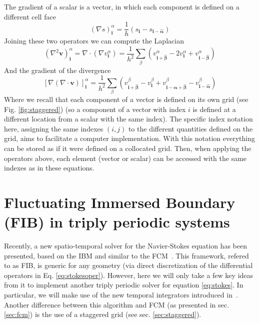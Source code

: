 \documentclass[ twoside,openright,titlepage,numbers=noenddot,%
headinclude,footinclude,cleardoublepage=empty,abstract=on,
BCOR=5mm,paper=b5,fontsize=11pt, dvipsnames
]{scrreprt}
\renewcommand{\vec}[1]{\bm{#1}}
\begin{document}
The gradient of a scalar is a vector, in which each component is defined on a different cell face
\begin{equation}
  \label{eq:staggeredgrad}
  (\nabla s)^\alpha_{\vec{i}} = \frac{1}{h}(s_{\vec{i}} - s_{\vec{i}- \vec{\hat{\alpha}}})
\end{equation}
Joining these two operators we can compute the Laplacian
\begin{equation}
  (\nabla^2\vec{v})^\alpha_{\vec{i}} = \nabla\cdot(\nabla v_{\vec{i}}^\alpha) = \frac{1}{h^2}\sum_\beta\left(v^\alpha_{\vec{i} +\vec{\hat{\beta}}}  - 2v^\alpha_{\vec{i}} + v^\alpha_{\vec{i} -\vec{\hat{\beta}}} \right)
\end{equation}
And the gradient of the divergence
\begin{equation}
  \label{eq:staggeredlap}
\left[\nabla(\nabla\cdot \vec{v})\right]^\alpha_{\vec{i}} = \frac{1}{h^2}\sum_\beta\left(v^\beta_{\vec{i} +\vec{\hat{\beta}}}  - v^\beta_{\vec{i}} + v^\beta_{\vec{i} -\vec{\hat{\alpha}} + \vec{\hat{\beta}}} - v^\beta_{\vec{i} -\vec{\hat{\alpha}}}\right)
\end{equation}
Where we recall that each component of a vector is defined on its own grid (see Fig. \ref{fig:staggered}) (so a component of a vector with index $i$ is defined at a different location from a scalar with the same index). The specific index notation here, assigning the same indexes $(i,j)$ to the different quantities defined on the grid, aims to facilitate a computer implementation. With this notation everything can be stored as if it were defined on a collocated grid. Then, when applying the operators above, each element (vector or scalar) can be accessed with the same indexes as in these equations.



\section{Fluctuating Immersed Boundary (FIB) in triply periodic systems}\label{sec:fib}
Recently, a new spatio-temporal solver for the Navier-Stokes equation has been presented, based on the \gls{IBM} and similar to the \gls{FCM}~\cite{Delong2014}. This framework, refered to as \gls{FIB}, is generic for any geometry (via direct discretization of the differential operators in Eq. \eqref{eq:stokesoper}). However, here we will only take a few key ideas from it to implement another triply periodic solver for equation \eqref{eq:stokes}. In particular, we will make use of the new temporal integrators introduced in~\cite{Delong2014}. Another difference between this algorithm and \gls{FCM} (as presented in sec. \ref{sec:fcm}) is the use of a staggered grid (see sec. \ref{sec:staggered}).
\end{document}
